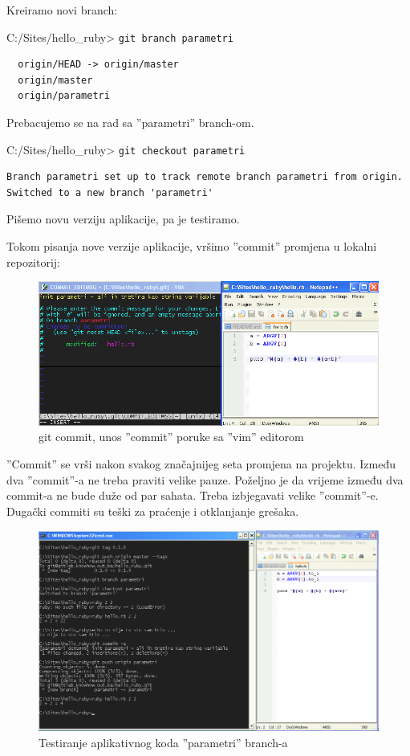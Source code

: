 \documentclass[times, utf8, seminar]{fit}
\begin{document}
\setlength{\parindent 0cm}
Kreiramo novi branch:

C:/Sites/hello\_ruby> \texttt{git branch parametri}
\begin{lstlisting}
  origin/HEAD -> origin/master
  origin/master
  origin/parametri
\end{lstlisting}

Prebacujemo se na rad sa ''parametri'' branch-om.

C:/Sites/hello\_ruby> \texttt{git checkout parametri}
\begin{lstlisting}
Branch parametri set up to track remote branch parametri from origin.
Switched to a new branch 'parametri'
\end{lstlisting}

Pišemo novu verziju aplikacije, pa je testiramo.

Tokom pisanja nove verzije aplikacije, vršimo ''commit'' promjena u lokalni repozitorij:

\begin{figure}[H]
\centering
\includegraphics[width=15cm]{img/gitlab_new_branch_commit_with_vim}
\caption{git commit, unos ''commit'' poruke sa ''vim'' editorom}
\end{figure}

''Commit'' se vrši nakon svakog značajnijeg seta promjena na projektu.  Između dva ''commit''-a ne treba praviti velike pauze. Poželjno je da vrijeme između dva commit-a ne bude duže od par sahata. Treba izbjegavati velike ''commit''-e. Dugački commiti su teški za praćenje i otklanjanje grešaka.

\begin{figure}[H]
\centering
\includegraphics[width=15cm]{img/gitlab_new_branch_3.png}
\caption{Testiranje aplikativnog koda ''parametri'' branch-a}
\end{figure}
\end{document}
